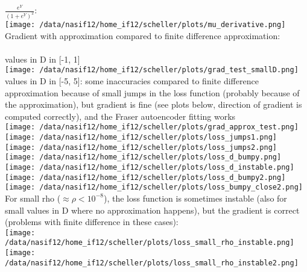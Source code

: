 \documentclass[12pt,a4paper, fleqn]{article}
\begin{document}
$\frac{e^{Y}}{\left(1+e^{Y}\right)^2}$:\\
\texttt{[image: /data/nasif12/home\_if12/scheller/plots/mu\_derivative.png]}
\\
Gradient with approximation compared to finite difference approximation: \\ \ \\
values in D in [-1, 1] \\
\texttt{[image: /data/nasif12/home\_if12/scheller/plots/grad\_test\_smallD.png]} 
\\
values in D in [-5, 5]: some inaccuracies compared to finite difference approximation because of small jumps in the loss function (probably because of the approximation), but gradient is fine (see plots below, direction of gradient is computed correctly), and the Fraser autoencoder fitting works \\
\texttt{[image: /data/nasif12/home\_if12/scheller/plots/grad\_approx\_test.png]} \\
\texttt{[image: /data/nasif12/home\_if12/scheller/plots/loss\_jumps1.png]}
\texttt{[image: /data/nasif12/home\_if12/scheller/plots/loss\_jumps2.png]} 
\\
\texttt{[image: /data/nasif12/home\_if12/scheller/plots/loss\_d\_bumpy.png]}
\texttt{[image: /data/nasif12/home\_if12/scheller/plots/loss\_d\_instable.png]} 
\\
\texttt{[image: /data/nasif12/home\_if12/scheller/plots/loss\_d\_bumpy2.png]} 
\texttt{[image: /data/nasif12/home\_if12/scheller/plots/loss\_bumpy\_close2.png]} 
\\
For small rho ($\approx \rho < 10^{-8}$), the loss function is sometimes instable (also for small values in D where no approximation happens), but the gradient is correct (problems with finite difference in these cases):\\
\texttt{[image: /data/nasif12/home\_if12/scheller/plots/loss\_small\_rho\_instable.png]}
\texttt{[image: /data/nasif12/home\_if12/scheller/plots/loss\_small\_rho\_instable2.png]}
\end{document}
